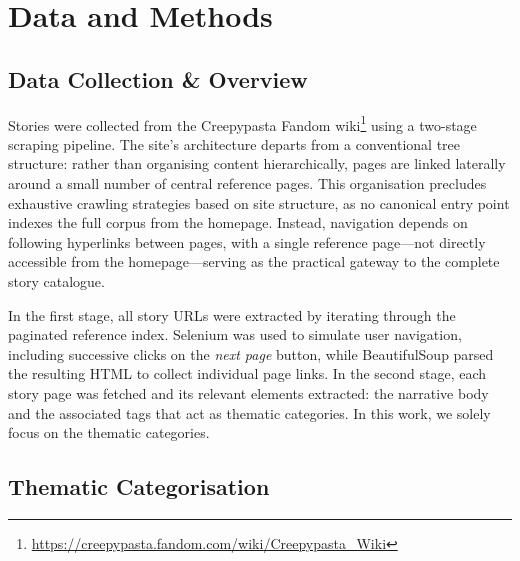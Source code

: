 \documentclass{anthology-ch}         %
\begin{document}
\section{Data and Methods}

\subsection{Data Collection \& Overview}

Stories were collected from the Creepypasta Fandom wiki\footnote{\url{https://creepypasta.fandom.com/wiki/Creepypasta_Wiki}} using a two-stage scraping pipeline. The site's architecture departs from a conventional tree structure: rather than organising content hierarchically, pages are linked laterally around a small number of central reference pages. This organisation precludes exhaustive crawling strategies based on site structure, as no canonical entry point indexes the full corpus from the homepage. Instead, navigation depends on following hyperlinks between pages, with a single reference page---not directly accessible from the homepage---serving as the practical gateway to the complete story catalogue.

In the first stage, all story URLs were extracted by iterating through the paginated reference index. Selenium was used to simulate user navigation, including successive clicks on the \emph{next page} button, while BeautifulSoup parsed the resulting HTML to collect individual page links. In the second stage, each story page was fetched and its relevant elements extracted: the narrative body and the associated tags that act as thematic categories. In this work, we solely focus on the thematic categories.





\subsection{Thematic Categorisation}
\end{document}
